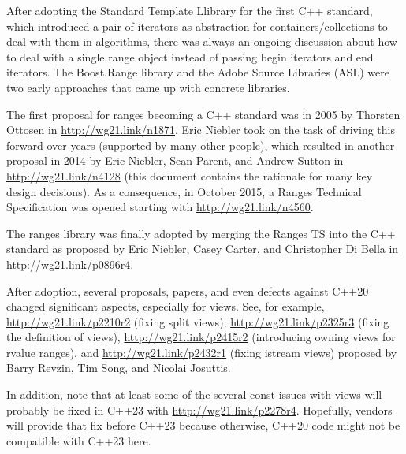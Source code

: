 After adopting the Standard Template Llibrary for the first C++ standard, which introduced a pair of iterators as abstraction for containers/collections to deal with them in algorithms, there was always an ongoing discussion about how to deal with a single range object instead of passing begin iterators and end iterators. The Boost.Range library and the Adobe Source Libraries (ASL) were two early approaches that came up with concrete libraries.

The first proposal for ranges becoming a C++ standard was in 2005 by Thorsten Ottosen in \url{http://wg21.link/n1871}. Eric Niebler took on the task of driving this forward over years (supported by many other people), which resulted in another proposal in 2014 by Eric Niebler, Sean Parent, and Andrew Sutton in \url{http://wg21.link/n4128} (this document contains the rationale for many key design decisions). As a consequence, in October 2015, a Ranges Technical Specification was opened starting with \url{http://wg21.link/n4560}. 

The ranges library was finally adopted by merging the Ranges TS into the C++ standard as proposed by Eric Niebler, Casey Carter, and Christopher Di Bella in \url{http://wg21.link/p0896r4}.

After adoption, several proposals, papers, and even defects against C++20 changed significant aspects, especially for views. See, for example, \url{http://wg21.link/p2210r2} (fixing split views), \url{http://wg21.link/p2325r3} (fixing the definition of views), \url{http://wg21.link/p2415r2} (introducing owning views for rvalue ranges), and \url{http://wg21.link/p2432r1} (fixing istream views) proposed by Barry Revzin, Tim Song, and Nicolai Josuttis.

In addition, note that at least some of the several const issues with views will probably be fixed in C++23 with \url{http://wg21.link/p2278r4}. Hopefully, vendors will provide that fix before C++23 because otherwise, C++20 code might not be compatible with C++23 here.